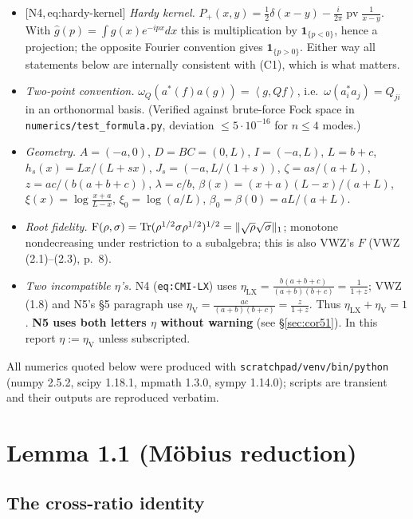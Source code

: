 \documentclass[11pt]{article}
\newcommand{\pv}{\operatorname{pv}}
\newcommand{\ip}[2]{\left\langle #1,#2\right\rangle}
\newcommand{\Nf}[1]{\textsf{[N4,\,#1]}}
\begin{document}
\begin{itemize}
\item[(C1)] \Nf{eq:hardy-kernel} \emph{Hardy kernel.}
$P_+(x,y)=\tfrac12\delta(x-y)-\tfrac{i}{2\pi}\pv\frac1{x-y}$.  With
$\widehat g(p)=\int g(x)e^{-ipx}dx$ this is multiplication by $\mathbf 1_{\{p<0\}}$, hence a
projection; the opposite Fourier convention gives $\mathbf 1_{\{p>0\}}$.  Either way all
statements below are internally consistent with (C1), which is what matters.
\item[(C2)] \emph{Two-point convention.} $\omega_Q(a^*(f)a(g))=\ip{g}{Qf}$, i.e.\
$\omega(a_i^*a_j)=Q_{ji}$ in an orthonormal basis.  (Verified against brute-force Fock space in
\texttt{numerics/test\_formula.py}, deviation $\le5\cdot10^{-16}$ for $n\le4$ modes.)
\item[(C3)] \emph{Geometry.} $A=(-a,0)$, $D=BC=(0,L)$, $I=(-a,L)$, $L=b+c$,
$h_s(x)=Lx/(L+sx)$, $J_s=(-a,L/(1+s))$, $\zeta=as/(a+L)$, $z=ac/(b(a+b+c))$,
$\lambda=c/b$, $\beta(x)=(x+a)(L-x)/(a+L)$, $\xi(x)=\log\frac{x+a}{L-x}$, $\xi_0=\log(a/L)$,
$\beta_0=\beta(0)=aL/(a+L)$.
\item[(C4)] \emph{Root fidelity.} $\operatorname{F}(\rho,\sigma)=\operatorname{Tr}(\rho^{1/2}\sigma\rho^{1/2})^{1/2}
=\|\sqrt\rho\sqrt\sigma\|_1$; monotone nondecreasing under restriction to a subalgebra; this is
also VWZ's $F$ (VWZ (2.1)--(2.3), p.~8).
\item[(C5)] \emph{Two incompatible $\eta$'s.}  N4 (\texttt{eq:CMI-LX}) uses
$\eta_{\mathrm{LX}}=\frac{b(a+b+c)}{(a+b)(b+c)}=\frac1{1+z}$; VWZ (1.8) and N5's
\S5 paragraph use $\eta_{\mathrm{V}}=\frac{ac}{(a+b)(b+c)}=\frac{z}{1+z}$.  Thus
$\eta_{\mathrm{LX}}+\eta_{\mathrm{V}}=1$.  \textbf{N5 uses both letters $\eta$ without warning}
(see \S\ref{sec:cor51}).  In this report $\eta:=\eta_{\mathrm{V}}$ unless subscripted.
\end{itemize}
All numerics quoted below were produced with
\texttt{scratchpad/venv/bin/python} (numpy 2.5.2, scipy 1.18.1, mpmath 1.3.0, sympy 1.14.0);
scripts are transient and their outputs are reproduced verbatim.

\section{Lemma 1.1 (M\"obius reduction)}\label{sec:mobius}

\subsection{The cross-ratio identity}
\end{document}
